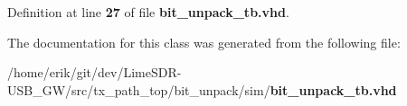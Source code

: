 Definition at line {\bf 27} of file {\bf bit\+\_\+unpack\+\_\+tb.\+vhd}.



The documentation for this class was generated from the following file\+:\begin{DoxyCompactItemize}
\item 
/home/erik/git/dev/\+Lime\+S\+D\+R-\/\+U\+S\+B\+\_\+\+G\+W/src/tx\+\_\+path\+\_\+top/bit\+\_\+unpack/sim/{\bf bit\+\_\+unpack\+\_\+tb.\+vhd}\end{DoxyCompactItemize}

